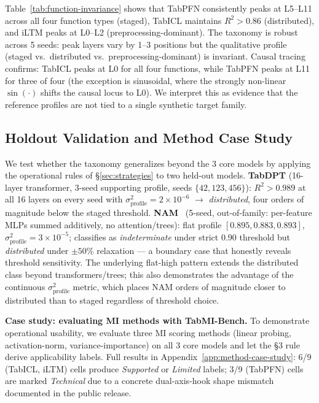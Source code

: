 \documentclass{article}
\begin{document}
Table~\ref{tab:function-invariance} shows that TabPFN consistently peaks at L5--L11 across all four function types (staged), TabICL maintains $R^2 > 0.86$ (distributed), and iLTM peaks at L0--L2 (preprocessing-dominant). The taxonomy is robust across 5 seeds: peak layers vary by 1--3 positions but the qualitative profile (staged vs.\ distributed vs.\ preprocessing-dominant) is invariant. Causal tracing confirms: TabICL peaks at L0 for all four functions, while TabPFN peaks at L11 for three of four (the exception is sinusoidal, where the strongly non-linear $\sin(\cdot)$ shifts the causal locus to L0). We interpret this as evidence that the reference profiles are not tied to a single synthetic target family.

\subsection{Holdout Validation and Method Case Study}
\label{sec:holdout}

We test whether the taxonomy generalizes beyond the 3 core models by applying the operational rules of \S\ref{sec:strategies} to two held-out models. \textbf{TabDPT} (16-layer transformer, 3-seed supporting profile, seeds $\{42, 123, 456\}$): $R^2 > 0.989$ at all 16 layers on every seed with $\sigma^2_\text{profile} = 2\times10^{-6}$ $\to$ \emph{distributed}, four orders of magnitude below the staged threshold. \textbf{NAM}~\cite{agarwal2021nam} (5-seed, out-of-family: per-feature MLPs summed additively, no attention/trees): flat profile $[0.895, 0.883, 0.893]$, $\sigma^2_\text{profile} = 3 \times 10^{-5}$; classifies as \emph{indeterminate} under strict 0.90 threshold but \emph{distributed} under $\pm 50$\% relaxation --- a boundary case that honestly reveals threshold sensitivity. The underlying flat-high pattern extends the distributed class beyond transformers/trees; this also demonstrates the advantage of the continuous $\sigma^2_\text{profile}$ metric, which places NAM orders of magnitude closer to distributed than to staged regardless of threshold choice.

\textbf{Case study: evaluating MI methods with TabMI-Bench.} To demonstrate operational usability, we evaluate three MI scoring methods (linear probing, activation-norm, variance-importance) on all 3 core models and let the \S3 rule derive applicability labels. Full results in Appendix~\ref{app:method-case-study}: 6/9 (TabICL, iLTM) cells produce \emph{Supported} or \emph{Limited} labels; 3/9 (TabPFN) cells are marked \emph{Technical} due to a concrete dual-axis-hook shape mismatch documented in the public release.
\end{document}
